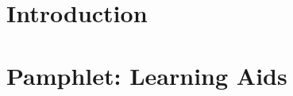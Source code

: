 \documentclass[../main.tex]{subfiles}
\begin{document}
\chapter{Introduction}

\chapter{Pamphlet: Learning Aids}

\end{document}
